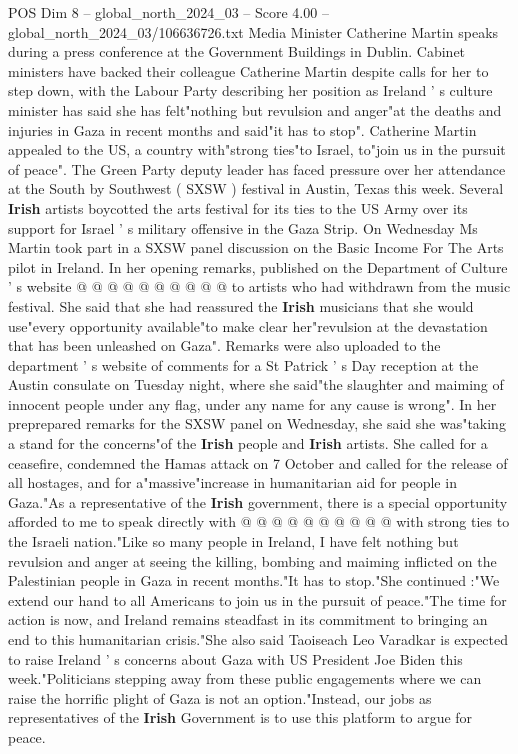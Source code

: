 \begin{textsample}{POS Dim 8 – global\_north\_2024\_03 – Score 4.00 – global\_north\_2024\_03/106636726.txt}  \label{ex:f8_pos_230}
Media Minister Catherine Martin speaks during a press conference at the Government Buildings in Dublin.
Cabinet ministers have backed their colleague Catherine Martin despite calls for her to step down, with the Labour Party describing her position as Ireland ' s culture minister has said she has felt"nothing but revulsion and anger"at the deaths and injuries in Gaza in recent months and said"it has to stop".
Catherine Martin appealed to the US, a country with"strong ties"to Israel, to"join us in the pursuit of peace".
The Green Party deputy leader has faced pressure over her attendance at the South by Southwest ( SXSW ) festival in Austin, Texas this week.
Several \textbf{Irish} artists boycotted the arts festival for its ties to the US Army over its support for Israel ' s military offensive in the Gaza Strip.
On Wednesday Ms Martin took part in a SXSW panel discussion on the Basic Income For The Arts pilot in Ireland.
In her opening remarks, published on the Department of Culture ' s website @ @ @ @ @ @ @ @ @ @ to artists who had withdrawn from the music festival.
She said that she had reassured the \textbf{Irish} musicians that she would use"every opportunity available"to make clear her"revulsion at the devastation that has been unleashed on Gaza".
Remarks were also uploaded to the department ' s website of comments for a St Patrick ' s Day reception at the Austin consulate on Tuesday night, where she said"the slaughter and maiming of innocent people under any flag, under any name for any cause is wrong".
In her preprepared remarks for the SXSW panel on Wednesday, she said she was"taking a stand for the concerns"of the \textbf{Irish} people and \textbf{Irish} artists.
She called for a ceasefire, condemned the Hamas attack on 7 October and called for the release of all hostages, and for a"massive"increase in humanitarian aid for people in Gaza."As a representative of the \textbf{Irish} government, there is a special opportunity afforded to me to speak directly with @ @ @ @ @ @ @ @ @ @ with strong ties to the Israeli nation."Like so many people in Ireland, I have felt nothing but revulsion and anger at seeing the killing, bombing and maiming inflicted on the Palestinian people in Gaza in recent months."It has to stop."She continued :"We extend our hand to all Americans to join us in the pursuit of peace."The time for action is now, and Ireland remains steadfast in its commitment to bringing an end to this humanitarian crisis."She also said Taoiseach Leo Varadkar is expected to raise Ireland ' s concerns about Gaza with US President Joe Biden this week."Politicians stepping away from these public engagements where we can raise the horrific plight of Gaza is not an option."Instead, our jobs as representatives of the \textbf{Irish} Government is to use this platform to argue for peace.

\end{textsample}
